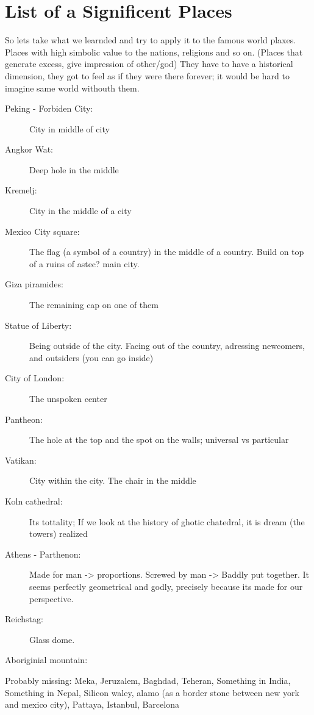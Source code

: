 \documentclass[10pt]{book}
\begin{document}
\chapter{List of a Significent Places}

So lets take what we learnded and try to apply it to the famous world plaxes. Places with high simbolic value to the nations, religions and so on. (Places that generate excess, give impression of other/god) They have to have a historical dimension, they got to feel as if they were there forever; it would be hard to imagine same world withouth them.

\begin{description}  

\item[Peking - Forbiden City:] City in middle of city
\item[Angkor Wat:] Deep hole in the middle
\item[Kremelj:] City in the middle of a city
\item[Mexico City square:] The flag (a symbol of a country) in the middle of a country. Build on top of a ruins of astec? main city.
\item[Giza piramides:] The remaining cap on one of them 
\item[Statue of Liberty:] Being outside of the city. Facing out of the country, adressing newcomers, and outsiders (you can go inside) 
\item[City of London:] The unspoken center 
\item[Pantheon:] The hole at the top and the spot on the walls; universal vs particular 
\item[Vatikan:] City within the city. The chair in the middle 
\item[Koln cathedral:] Its tottality; If we look at the history of ghotic chatedral, it is dream (the towers) realized 
\item[Athens - Parthenon:] Made for man -> proportions. Screwed by man -> Baddly put together. It seems perfectly geometrical and godly, precisely because its made for our perspective. 
\item[Reichstag:] Glass dome. 
\item[Aboriginial mountain:] 

\end{description} 

Probably missing: Meka, Jeruzalem, Baghdad, Teheran, Something in India, Something in Nepal, Silicon waley, alamo (as a border stone between new york and mexico city), Pattaya, Istanbul, Barcelona
\end{document}
